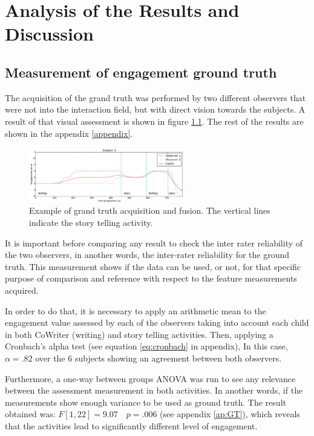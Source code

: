 \chapter{Analysis of the Results and Discussion} \label{chap:results}

\section{Measurement of engagement ground truth}
The acquisition of the grand truth was performed by two different observers that were not into the interaction field, but with direct vision towards the subjects. A result of that visual assessment is shown in figure \ref{fig:GTexample}. The rest of the results are shown in the appendix \ref{appendix}.

\begin{figure}[h!]
        \centering
        \includegraphics[width=0.6\textwidth]{figures/GTexample.png}
        \caption{Example of grand truth acquisition and fusion. The vertical lines indicate the story telling activity.}
        \label{fig:GTexample}
\end{figure}

It is important before comparing any result to check the inter rater reliability of the two observers, in another words, the inter-rater reliability for the ground truth. This measurement shows if the data can be used, or not, for that specific purpose of comparison and reference with respect to the feature measurements acquired. 

In order to do that, it is necessary to apply an arithmetic mean to the engagement value assessed by each of the observers taking into account each child in both CoWriter (writing) and story telling activities. Then, applying a Cronbach's alpha test (see equation \ref{eq:cronbach} in appendix), In this case, $\alpha = .82$ over the 6 subjects showing an agreement between both observers.

Furthermore, a one-way between groups ANOVA was run to see any relevance between the assessment measurement in both activities. In another words, if the measurements show enough variance to be used as ground truth. The result obtained was: $F[1,22] = 9.07 \quad p=.006$ (see appendix \ref{ap:GT}), which reveals that the activities lead to significantly different level of engagement.


